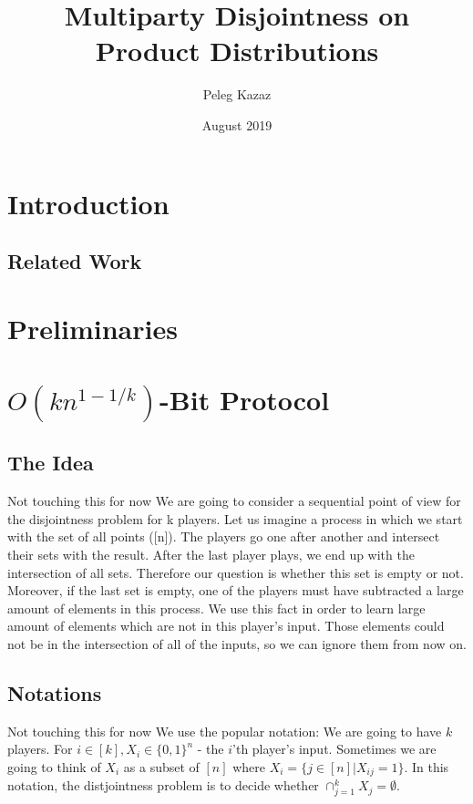 \documentclass{article}
\title{Multiparty Disjointness on Product Distributions}
\author{Peleg Kazaz}
\date{August 2019}
\newcommand{\Rnote}[1]{ { \color{magenta} #1 } }
\theoremstyle{plain}
\begin{document}
\maketitle


\section{Introduction}

\subsection{Related Work}
\section{Preliminaries}

\section{$O(kn^{1-1/k})$-Bit Protocol}
\subsection{The Idea}
\Rnote{Not touching this for now}
We are going to consider a sequential point of view for the disjointness problem for k players. Let us imagine a process in which we start with the set of all points ([n]). The players go one after another and intersect their sets with the result. After the last player plays, we end up with the intersection of all sets. Therefore our question is whether this set is empty or not. Moreover, if the last set is empty, one of the players must have subtracted a large amount of elements in this process. We use this fact in order to learn large amount of elements which are not in this player's input. Those elements could not be in the intersection of all of the inputs, so we can ignore them from now on. 
\subsection{Notations}
\Rnote{Not touching this for now}
We use the popular notation: We are going to have $k$ players. For $i \in [k], X_i \in \{0,1\}^{n}$ - the $i$'th player's input. Sometimes we are going to think of $X_i$ as a subset of $[n]$ where $X_i = \{j \in [n] | X_{ij} = 1\}$. In this notation, the distjointness problem is to decide whether $\cap^{k}_{j=1}X_j = \emptyset$. \newline
\end{document}

